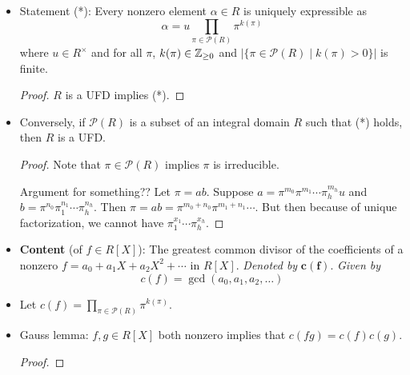 \documentclass[../notes.tex]{subfiles}
\begin{document}
\begin{itemize}
    \item Statement (*): Every nonzero element $\alpha\in R$ is uniquely expressible as
    \begin{equation*}
        \alpha = u\prod_{\pi\in\mathcal{P}(R)}\pi^{k(\pi)}
    \end{equation*}
    where $u\in R^\times$ and for all $\pi$, $k(\pi)\in{\mathbb{Z}_{\geq 0}}$ and $|\{\pi\in\mathcal{P}(R)\mid k(\pi)>0\}|$ is finite.
    \begin{proof}
        $R$ is a UFD implies (*).
    \end{proof}
    \item Conversely, if $\mathcal{P}(R)$ is a subset of an integral domain $R$ such that (*) holds, then $R$ is a UFD.
    \begin{proof}
        Note that $\pi\in\mathcal{P}(R)$ implies $\pi$ is irreducible.\par
        Argument for something?? Let $\pi=ab$. Suppose $a=\pi^{m_0}\pi^{m_1}\cdots\pi_h^{m_h}u$ and $b=\pi^{n_0}\pi_1^{n_1}\cdots\pi_h^{n_h}$. Then $\pi=ab=\pi^{m_0+n_0}\pi^{m_1+n_1}\cdots$. But then because of unique factorization, we cannot have $\pi_1^{x_1}\cdots\pi_h^{x_h}$.
    \end{proof}
    \item \textbf{Content} (of $f\in R[X]$): The greatest common divisor of the coefficients of a nonzero $f=a_0+a_1X+a_2X^2+\cdots$ in $R[X]$. \emph{Denoted by} $\bm{c(f)}$. \emph{Given by}
    \begin{equation*}
        c(f) = \gcd(a_0,a_1,a_2,\dots)
    \end{equation*}
    \item Let $c(f)=\prod_{\pi\in\mathcal{P}(R)}\pi^{k(\pi)}$.
    \item Gauss lemma: $f,g\in R[X]$ both nonzero implies that $c(fg)=c(f)c(g)$.
    \begin{proof}


\end{proof}
\end{itemize}
\end{document}
